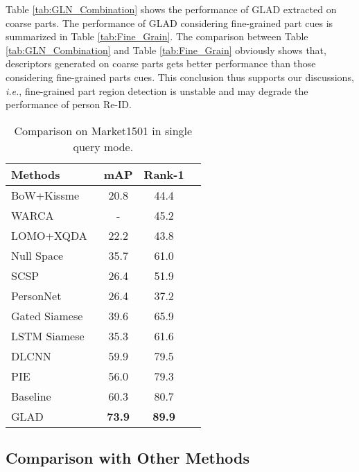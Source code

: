 \documentclass[sigconf]{acmart}
\begin{document}
Table \ref{tab:GLN_Combination} shows the performance of GLAD extracted on coarse parts. The performance of GLAD considering fine-grained part cues is summarized in Table \ref{tab:Fine_Grain}. The comparison between Table \ref{tab:GLN_Combination} and Table \ref{tab:Fine_Grain} obviously shows that, descriptors generated on coarse parts gets better performance than those considering fine-grained parts cues. This conclusion thus supports our discussions, \emph{i.e.}, fine-grained part region detection is unstable and may degrade the performance of person Re-ID.







\begin{table}
\centering
\small
\caption{Comparison on Market1501 in single query mode.}
\begin{tabular}{lccc}
\hline
 Methods         &mAP     &Rank-1 \\
\hline
BoW+Kissme~\cite{market1501}       &20.8    &44.4\\
WARCA~\cite{WARCA}       &-    &45.2 \\
LOMO+XQDA~\cite{LOMOXQAD} &22.2    &43.8\\
Null Space~\cite{LDNS} &35.7  &61.0\\
SCSP~\cite{scsp} &26.4 &51.9 \\
\hline
PersonNet~\cite{wu2016personnet}     &26.4    &37.2 \\
Gated Siamese~\cite{GatedSiamese}    &39.6    &65.9 \\
LSTM Siamese~\cite{varior2016siamese}      &35.3    &61.6 \\
DLCNN~\cite{zheng2016discriminatively} &59.9 &79.5\\
PIE~\cite{zheng2017pose}     &56.0    &79.3 \\
\hline
Baseline & 60.3  & 80.7 \\
GLAD     &{\bf73.9}   &{\bf89.9}\\
\hline
\end{tabular}
\label{tab:market}
\end{table}


\subsection{Comparison with Other Methods}
\end{document}

